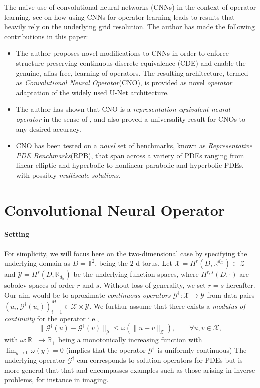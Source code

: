 \documentclass[reqno,10pt]{amsart}
\theoremstyle{plain}
\theoremstyle{definition}
\newcommand{\bb}[1]{\mathbb{#1}}
\newcommand{\cal}[1]{\mathcal{#1}}
\begin{document}
    \noindent The naive use of convolutional neural networks (CNNs) in the context of operator learning, see \cite{FB2023,Zhu2018,ZL2021} on how using CNNs for operator learning leads to results that heavily rely on the underlying grid resolution. The author has made the following contributions in this paper:
    \begin{itemize}
        \item The author proposes novel modifications to CNNs in order to enforce structure-preserving continuous-discrete equivalence (CDE) and enable the genuine, alias-free, learning of operators. The  resulting architecture, termed as {\it Convolutional Neural Operator}(CNO), is provided as novel {\it operator} adaptation of the widely used U-Net architecture.
        \item The author has shown that CNO is a {\it representation equivalent neural operator} in the sense of \cite{FB2023}, and also proved a universality result for CNOs to any desired accuracy.
        \item CNO has been tested on a {\it novel} set of benchmarks, known as {\it Representative PDE Benchmarks}(RPB), that span across a variety of PDEs ranging from linear elliptic and hyperbolic to nonlinear parabolic and hyperbolic PDEs, with possibly {\it multiscale solutions}. 
    \end{itemize}

    \section{Convolutional Neural Operator}
    \paragraph{\bf Setting} For simplicity, we will focus here on the two-dimensional case by specifying the underlying domain as $D = \bb T^2$, being the $2$-d torus. Let $\cal X = H^r(D,\bb R^{d_{\cal X}}) \subset \cal Z$ and $\cal Y = H^s(D,\bb R_{d_\cal Y})$ be the underlying function spaces, where $H^{r,s}(D,\cdot)$ are sobolev spaces of order $r$ and $s$. Without loss of generality, we set $r = s$ hereafter. Our aim would be to aproximate {\it continuous operators} $\cal G^\dag : \cal X \to \cal Y$ from data pairs $(u_i, \cal G^\dag(u_i))_{i=1}^M \in \cal X \times \cal Y$. We furthur assume that there exists a {\it modulus of continuity} for the operator i.e.,
    \begin{equation}\label{eq2.1}
        \|\cal G^\dag(u) - \cal G^\dag(v)\|_{\cal Y} \leq \omega(\|u - v\|_{\cal Z}), \qquad \forall u,v \in \cal X,
    \end{equation}
    with $\omega : \bb R_+ \to \bb R_+$ being a monotonically increasing function with $\lim_{y\to 0}\omega(y) = 0$ (implies that the operator $\cal G^\dag$ is uniformly continuous) The underlying operator $\cal G^\dag$ can corresponds to solution operators for PDEs but is more general that that and encompasses examples such as those arising in inverse problems, for instance in imaging.
\end{document}
